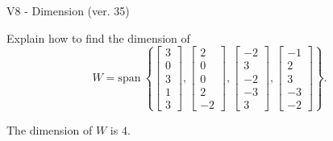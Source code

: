 \begin{exercise}
  \begin{exerciseTitle}V8 - Dimension (ver. 35)\end{exerciseTitle}
  \begin{exerciseStatement}
    Explain how to find the dimension of 
\[W=\mathrm{span}\ \left\{\left[\begin{array}{r}
3 \\
0 \\
3 \\
1 \\
3
\end{array}\right] , \left[\begin{array}{r}
2 \\
0 \\
0 \\
2 \\
-2
\end{array}\right] , \left[\begin{array}{r}
-2 \\
3 \\
-2 \\
-3 \\
3
\end{array}\right] , \left[\begin{array}{r}
-1 \\
2 \\
3 \\
-3 \\
-2
\end{array}\right]\right\}.\]



  \end{exerciseStatement}
  \begin{exerciseAnswer}
   The dimension of \(W\) is  \(4\).
  


  \end{exerciseAnswer}
\end{exercise}